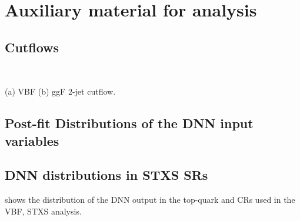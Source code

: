\FloatBarrier
\chapter{Auxiliary material for \HWW analysis}

\FloatBarrier
\section{Cutflows}
\label{app:cutflows}

\begin{landscape}
    \thispagestyle{empty} 
    \begin{table}
        \subfloat[]{
        \resizebox{\textwidth}{!}{
        
        }
        } \\
        \vspace{20pt}
        \subfloat[]{
        \resizebox{\textwidth}{!}{
        
        }
        }
        \caption{(a) VBF (b) ggF 2-jet cutflow.}
        \label{app:tab:cutflows}
    \end{table}   
\end{landscape}

\FloatBarrier
\section{Post-fit Distributions of the DNN input variables}
\label{app:post-fit-distributions}


\FloatBarrier
\section{DNN distributions in STXS SRs}
 shows the distribution of the DNN output in the top-quark and \Ztautau CRs used in the VBF, STXS analysis. 

